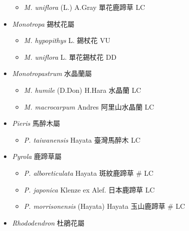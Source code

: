\begin{itemize}
  \begin{itemize}
        \item[] \textit{M. uniflora} (L.) A.Gray  單花鹿蹄草   LC
  \end{itemize}
 \item[] \textit{Monotropa} 錫杖花屬
                                
  \begin{itemize}
        \item[] \textit{M. hypopithys} L.  錫杖花   VU
        \item[] \textit{M. uniflora} L.  單花錫杖花   DD
  \end{itemize}
 \item[] \textit{Monotropastrum} 水晶蘭屬
                                
  \begin{itemize}
        \item[] \textit{M. humile} (D.Don) H.Hara  水晶蘭   LC
        \item[] \textit{M. macrocarpum} Andres  阿里山水晶蘭   LC
  \end{itemize}
 \item[] \textit{Pieris} 馬醉木屬
                                
  \begin{itemize}
        \item[] \textit{P. taiwanensis} Hayata  臺灣馬醉木   LC
  \end{itemize}
 \item[] \textit{Pyrola} 鹿蹄草屬
                                
  \begin{itemize}
        \item[] \textit{P. alboreticulata} Hayata  斑紋鹿蹄草  \# LC
        \item[] \textit{P. japonica} Klenze ex Alef.  日本鹿蹄草   LC
        \item[] \textit{P. morrisonensis} (Hayata) Hayata  玉山鹿蹄草  \# LC
  \end{itemize}
 \item[] \textit{Rhododendron} 杜鵑花屬
                                

\end{itemize}
